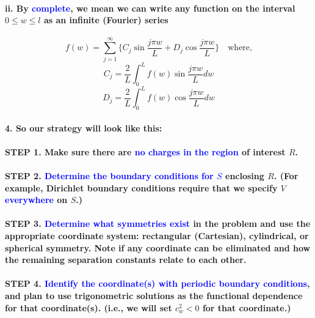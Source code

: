 \documentclass{article}
\begin{document}
\paragraph{\indent ii. By \textcolor{blue}{complete}, we mean we can write any function on the interval $0\leq w\leq l$ as an infinite (Fourier) series}
\begin{equation*}
    f(w)=\sum_{j=1}^{\infty}\bigg\{ C_j\sin \frac{j\pi w}{L}+D_j\cos\frac{j\pi w}{L}\bigg\} \quad \text{where,}
\end{equation*}
\begin{equation*}
    C_j=\frac{2}{L}\int_0^L f(w)\sin\frac{j\pi w}{L}dw
\end{equation*}
\begin{equation*}
    D_j=\frac{2}{L}\int_0^L f(w)\cos\frac{j\pi w}{L}dw
\end{equation*} 
\paragraph{4. So our strategy will look like this:}
\paragraph{\indent STEP 1. Make sure there are \textcolor{blue}{no charges in the region} of interest $R$.}
\paragraph{\indent STEP 2. \textcolor{blue}{Determine the boundary conditions for $S$} enclosing $R$. (For example, Dirichlet boundary conditions require that we specify $V$ \textcolor{blue}{everywhere} on $S$.)}
\paragraph{\indent STEP 3. \textcolor{blue}{Determine what symmetries exist} in the problem and use the appropriate coordinate system: rectangular (Cartesian), cylindrical, or spherical symmetry. Note if any coordinate can be eliminated and how the remaining separation constants relate to each other.}
\paragraph{\indent STEP 4. \textcolor{blue}{Identify the coordinate(s) with periodic boundary conditions}, and plan to use trigonometric solutions as the functional dependence for that coordinate(s). (i.e., we will set $c_w^2<0$ for that coordinate.)}
\end{document}

